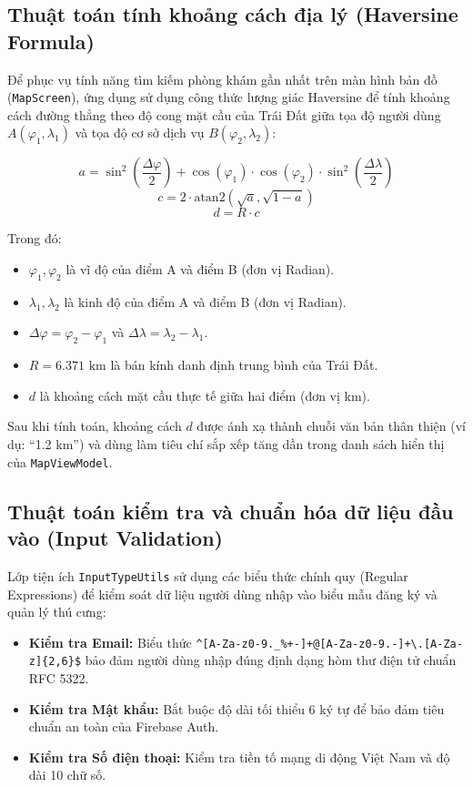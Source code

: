 \subsection{Thuật toán tính khoảng cách địa lý (Haversine Formula)}
Để phục vụ tính năng tìm kiếm phòng khám gần nhất trên màn hình bản đồ (\texttt{MapScreen}), ứng dụng sử dụng công thức lượng giác Haversine để tính khoảng cách đường thẳng theo độ cong mặt cầu của Trái Đất giữa tọa độ người dùng $A(\varphi_1, \lambda_1)$ và tọa độ cơ sở dịch vụ $B(\varphi_2, \lambda_2)$:

\begin{equation}
    a = \sin^2\left(\frac{\Delta \varphi}{2}\right) + \cos(\varphi_1) \cdot \cos(\varphi_2) \cdot \sin^2\left(\frac{\Delta \lambda}{2}\right)
\end{equation}
\begin{equation}
    c = 2 \cdot \text{atan2}\left(\sqrt{a}, \sqrt{1 - a}\right)
\end{equation}
\begin{equation}
    d = R \cdot c
\end{equation}

Trong đó:
\begin{itemize}
    \item $\varphi_1, \varphi_2$ là vĩ độ của điểm A và điểm B (đơn vị Radian).
    \item $\lambda_1, \lambda_2$ là kinh độ của điểm A và điểm B (đơn vị Radian).
    \item $\Delta \varphi = \varphi_2 - \varphi_1$ và $\Delta \lambda = \lambda_2 - \lambda_1$.
    \item $R = 6.371\text{ km}$ là bán kính danh định trung bình của Trái Đất.
    \item $d$ là khoảng cách mặt cầu thực tế giữa hai điểm (đơn vị km).
\end{itemize}

Sau khi tính toán, khoảng cách $d$ được ánh xạ thành chuỗi văn bản thân thiện (ví dụ: ``1.2 km'') và dùng làm tiêu chí sắp xếp tăng dần trong danh sách hiển thị của \texttt{MapViewModel}.

\subsection{Thuật toán kiểm tra và chuẩn hóa dữ liệu đầu vào (Input Validation)}
Lớp tiện ích \texttt{InputTypeUtils} sử dụng các biểu thức chính quy (Regular Expressions) để kiểm soát dữ liệu người dùng nhập vào biểu mẫu đăng ký và quản lý thú cưng:
\begin{itemize}
    \item \textbf{Kiểm tra Email:} Biểu thức \texttt{\textasciicircum[A-Za-z0-9.\_\%+-]+@[A-Za-z0-9.-]+\textbackslash.[A-Za-z]\{2,6\}\$} bảo đảm người dùng nhập đúng định dạng hòm thư điện tử chuẩn RFC 5322.
    \item \textbf{Kiểm tra Mật khẩu:} Bắt buộc độ dài tối thiểu 6 ký tự để bảo đảm tiêu chuẩn an toàn của Firebase Auth.
    \item \textbf{Kiểm tra Số điện thoại:} Kiểm tra tiền tố mạng di động Việt Nam và độ dài 10 chữ số.
\end{itemize}

